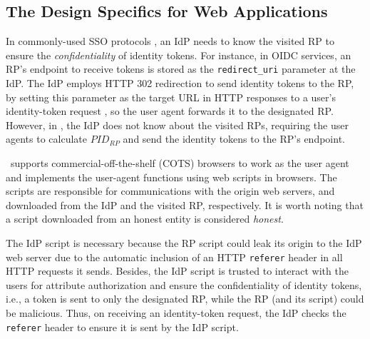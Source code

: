 \subsection{The Design Specifics for Web Applications}
\label{sec:web-design}

In commonly-used SSO protocols \cite{OpenIDConnect,rfc6749, SAML, SAMLIdentifier},
an IdP needs to know the visited RP to ensure the \emph{confidentiality} of identity tokens. For instance, in OIDC services, an RP's endpoint to receive tokens is stored as the \verb+redirect_uri+ parameter at the IdP. The IdP employs HTTP 302 redirection to send identity tokens to the RP, by setting this parameter as the target URL in HTTP responses to a user's identity-token request \cite{OpenIDConnect}, so the user agent forwards it to the designated RP.
However, in \usso, the IdP does not know about the visited RPs, requiring the user agents to calculate $PID_{RP}$ and send the identity tokens to the RP's endpoint.

\usso\ supports commercial-off-the-shelf (COTS) browsers to work as the user agent and implements the user-agent functions using web scripts in browsers. The scripts are responsible for communications with the origin web servers,
 and downloaded from the IdP and the visited RP, respectively. It is worth noting that a script downloaded from an honest entity is considered \emph{honest}.

The IdP script is necessary because the RP script could leak its origin to the IdP web server due to the automatic inclusion of an HTTP \verb+referer+ header in all HTTP requests it sends.
Besides, the IdP script is trusted to interact with the users for attribute authorization and ensure the confidentiality of identity tokens, i.e., a token is sent to only the designated RP, while the RP (and its script) could be malicious. Thus, on receiving an identity-token request, the IdP checks the \verb+referer+ header to ensure it is sent by the IdP script.

